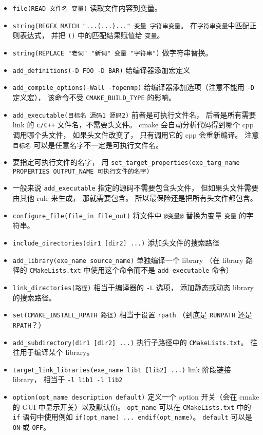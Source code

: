 \begin{itemize}
\item \verb`file(READ 文件名 变量)` 读取文件内容到变量。
\item \verb`string(REGEX MATCH "...(...)..." 变量 字符串变量`。 在\verb`字符串变量`中匹配正则表达式， 并把 \verb`()` 中的匹配结果赋值给 \verb`变量`。
\item \verb`string(REPLACE "老词" "新词" 变量 "字符串")` 做字符串替换。
\item \verb`add_definitions(-D FOO -D BAR)` 给编译器添加宏定义
\item \verb`add_compile_options(-Wall -fopenmp)` 给编译器添加选项（注意不能用 \verb`-D` 定义宏）， 该命令不受 \verb`CMAKE_BUILD_TYPE` 的影响。
\item \verb`add_executable(目标名 源码1 源码2)` 前者是可执行文件名， 后者是所有需要 link 的 \verb`c/C++` 文件名，不需要头文件。 cmake 会自动分析代码得到哪个 cpp 调用哪个头文件， 如果头文件改变了， 只有调用它的 cpp 会重新编译。 注意 \verb`目标名` 可以是任意名字不一定是可执行文件名。
\item 要指定可执行文件的名字， 用 \verb`set_target_properties(exe_targ_name PROPERTIES OUTPUT_NAME 可执行文件的名字)`
\item 一般来说 \verb`add_executable` 指定的源码不需要包含头文件， 但如果头文件需要由其他 rule 来生成， 那就需要包含。 所以最保险还是把所有头文件都包含。
\item \verb`configure_file(file_in file_out)` 将文件中 \verb`@变量@` 替换为变量 \verb`变量` 的字符串。
\item \verb`include_directories(dir1 [dir2] ...)` 添加头文件的搜索路径
\item \verb`add_library(exe_name source_name)` 单独编译一个 library （在 library 路径的 \verb`CMakeLists.txt` 中使用这个命令而不是 \verb`add_executable` 命令）
\item \verb`link_directories(路径)` 相当于编译器的 \verb`-L` 选项， 添加静态或动态 library 的搜索路径。
\item \verb`set(CMAKE_INSTALL_RPATH 路径)` 相当于设置 \verb`rpath` （到底是 \verb`RUNPATH` 还是 \verb`RPATH`？）
\item \verb`add_subdirectory(dir1 [dir2] ...)` 执行子路径中的 \verb`CMakeLists.txt`。 往往用于编译某个 library。
\item \verb`target_link_libraries(exe_name lib1 [lib2] ...)` link 阶段链接 library， 相当于 \verb`-l lib1 -l lib2`
\item \verb`option(opt_name description default)` 定义一个 option 开关（会在 cmake 的 GUI 中显示开关）以及默认值。 \verb`opt_name` 可以在 \verb`CMakeLists.txt` 中的 \verb`if` 语句中使用例如 \verb`if(opt_name) ... endif(opt_name)`。 \verb`default` 可以是 \verb`ON` 或 \verb`OFF`。

\end{itemize}

